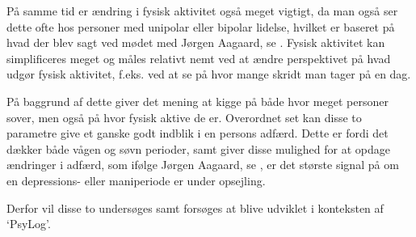 På samme tid er ændring i fysisk aktivitet også meget vigtigt, da man også ser dette ofte hos personer med unipolar eller bipolar lidelse, hvilket er baseret på hvad der blev sagt ved mødet med Jørgen Aagaard, se \citep[Kapitel 1, Sektion 4]{misc:faellesrapp}. 
Fysisk aktivitet kan simplificeres meget og måles relativt nemt ved at ændre perspektivet på hvad udgør fysisk aktivitet, f.eks. ved at se på hvor mange skridt man tager på en dag.

På baggrund af dette giver det mening at kigge på både hvor meget personer sover, men også på hvor fysisk aktive de er.
Overordnet set kan disse to parametre give et ganske godt indblik i en persons adfærd.
Dette er fordi det dækker både vågen og søvn perioder, samt giver disse mulighed for at opdage ændringer i adfærd, som ifølge Jørgen Aagaard, se \citet[Kapitel 1, Sektion 4]{misc:faellesrapp}, er det største signal på om en depressions- eller maniperiode er under opsejling. 

Derfor vil disse to undersøges samt forsøges at blive udviklet i konteksten af `PsyLog'.